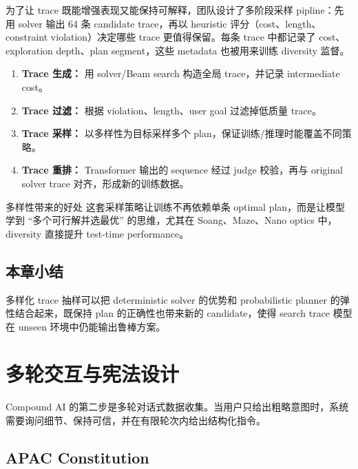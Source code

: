 \documentclass[a4paper]{article}
\begin{document}
为了让 trace 既能增强表现又能保持可解释，团队设计了多阶段采样 pipline：先用 solver 输出 64 条 candidate trace，再以 heuristic 评分（cost、length、constraint violation）决定哪些 trace 更值得保留。每条 trace 中都记录了 cost、exploration depth、plan segment，这些 metadata 也被用来训练 diversity 监督。
\begin{enumerate}
    \item \textbf{Trace 生成：} 用 solver/Beam search 构造全局 trace，并记录 intermediate cost。
    \item \textbf{Trace 过滤：} 根据 violation、length、user goal 过滤掉低质量 trace。
    \item \textbf{Trace 采样：} 以多样性为目标采样多个 plan，保证训练/推理时能覆盖不同策略。
    \item \textbf{Trace 重排：} Transformer 输出的 sequence 经过 judge 校验，再与 original solver trace 对齐，形成新的训练数据。
\end{enumerate}
\begin{knowledgebox}{多样性带来的好处}
这套采样策略让训练不再依赖单条 optimal plan，而是让模型学到 ``多个可行解并选最优'' 的思维，尤其在 Soang、Maze、Nano optics 中，diversity 直接提升 test-time performance。
\end{knowledgebox}

\subsection{本章小结}

多样化 trace 抽样可以把 deterministic solver 的优势和 probabilistic planner 的弹性结合起来，既保持 plan 的正确性也带来新的 candidate，使得 search trace 模型在 unseen 环境中仍能输出鲁棒方案。

\section{多轮交互与宪法设计}

Compound AI 的第二步是多轮对话式数据收集。当用户只给出粗略意图时，系统需要询问细节、保持可信，并在有限轮次内给出结构化指令。

\subsection{APAC Constitution}
\end{document}
